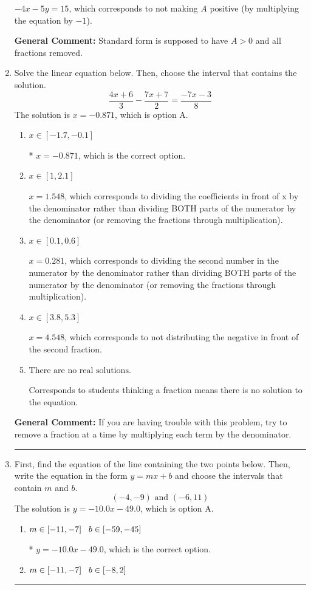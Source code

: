 \documentclass{extbook}[14pt]
\newcommand{\litem}[1]{\item #1

\rule{\textwidth}{0.4pt}}
\begin{document}
\begin{enumerate}
{\begin{enumerate}[label=\Alph*.]
 $-4x - 5y = 15$, which corresponds to not making $A$ positive (by multiplying the equation by $-1$).
\end{enumerate}

\textbf{General Comment:} Standard form is supposed to have $A > 0$ and all fractions removed.
}
\litem{
Solve the linear equation below. Then, choose the interval that contains the solution.
\[ \frac{4x + 6}{3} - \frac{7x + 7}{2} = \frac{-7x -3}{8} \]The solution is \( x = -0.871 \), which is option A.\begin{enumerate}[label=\Alph*.]
\item \( x \in [-1.7, -0.1] \)

* $x = -0.871$, which is the correct option.
\item \( x \in [1, 2.1] \)

 $x = 1.548$, which corresponds to dividing the coefficients in front of x by the denominator rather than dividing BOTH parts of the numerator by the denominator (or removing the fractions through multiplication).
\item \( x \in [0.1, 0.6] \)

 $x = 0.281$, which corresponds to dividing the second number in the numerator by the denominator rather than dividing BOTH parts of the numerator by the denominator (or removing the fractions through multiplication).
\item \( x \in [3.8, 5.3] \)

 $x = 4.548$, which corresponds to not distributing the negative in front of the second fraction.
\item \( \text{There are no real solutions.} \)

Corresponds to students thinking a fraction means there is no solution to the equation.
\end{enumerate}

\textbf{General Comment:} If you are having trouble with this problem, try to remove a fraction at a time by multiplying each term by the denominator.
}
\litem{
First, find the equation of the line containing the two points below. Then, write the equation in the form $ y=mx+b $ and choose the intervals that contain $m$ and $b$.
\[ (-4, -9) \text{ and } (-6, 11) \]The solution is \( y = -10.0x -49.0 \), which is option A.\begin{enumerate}[label=\Alph*.]
\item \( m \in [-11, -7] \hspace*{3mm} b \in [-59, -45] \)

* $y = -10.0x -49.0$, which is the correct option.
\item \( m \in [-11, -7] \hspace*{3mm} b \in [-8, 2] \)


\end{enumerate}}
\end{enumerate}
\end{document}
